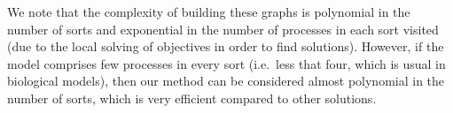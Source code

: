 \documentclass{movep}
\newcommand{\PHfrappeB}{\Rsh}
\newcommand{\PHobjectif}[2]{\mbox{$#1\PHfrappeB^*\!#2$}}
\newcommand{\PHobj}{\PHobjectif}
\def\ctx{\varsigma}
\def\PHget#1#2{{#1[#2]}}
\def\ctx{\varsigma}
\newcounter{la}
\newcommand{\ie}{i.e.\ }
\begin{document}
\begin{comment}
In order to build the GLC of the under-approximation,
we need to extend the notion of initial state $\ctx$ to a more general notion of \emph{context},
in which each sort can contain several (initially) active processes.
This allows to iteratively \emph{complete} this initial context
with all the process nodes contained in the graph.
In other words, this GLC is computed several times (until a fixed point is reached)
by adding in the initial context all the processes that are potentially new source processes
for each objective.
Indeed, if two processes of a sort $b$, say, $b_j$ and $b_k$ are needed to solve
two different objectives, %
then one has to ensure that
$b_j$ and $b_k$ are both reachable from the initial state process $\PHget{\ctx}{b}$,
but also that $b_j$ is reachable from $b_k$ and $b_k$ is reachable from $b_j$.
Thus, new objectives $\PHobj{b_j}{b_k}$ and $\PHobj{b_k}{b_j}$ are required,
which is expressed by adding $b_j$ and $b_k$ to the initial context.
Finally, the under-approximation GLC is built the same way
than the over-approximation one, but a process may be linked to several objective nodes,
and the initial context is iteratively expanded as explained.
\end{comment}

We note that the complexity of building these graphs is polynomial in the number of sorts
and exponential in the number of processes in each sort visited
(due to the local solving of objectives in order to find solutions).
However, if the model comprises few processes in every sort
(\ie less that four, which is usual in biological models),
then our method can be considered almost polynomial in the number of sorts, which is very efficient
compared to other solutions.
\end{document}
